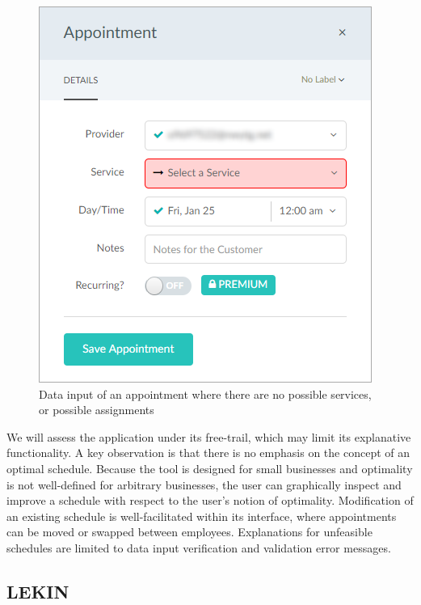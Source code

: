 \begin{figure}[H]
	\begin{center}
		\includegraphics[scale=0.6]{figures/setmoreerror2.png}
	\end{center}
	\caption{Data input of an appointment where there are no possible services, or possible assignments}
\end{figure}

We will assess the application under its free-trail, which may limit its explanative functionality. A key observation is that there is no emphasis on the concept of an optimal schedule. Because the tool is designed for small businesses and optimality is not well-defined for arbitrary businesses, the user can graphically inspect and improve a schedule with respect to the user's notion of optimality. Modification of an existing schedule is well-facilitated within its interface, where appointments can be moved or swapped between employees. Explanations for unfeasible schedules are limited to data input verification and validation error messages.

\subsection{LEKIN}

